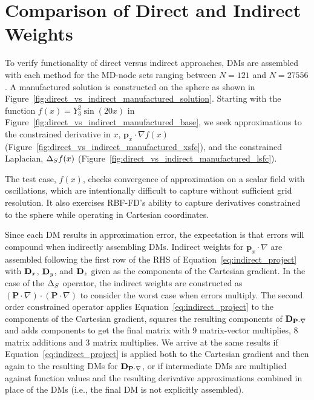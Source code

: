 \section{Comparison of Direct and Indirect Weights} 


To verify functionality of direct versus indirect approaches, DMs are assembled with each method for the MD-node sets ranging between $N = 121$ and $N=27556$. A manufactured solution is constructed on the sphere as shown in Figure~\ref{fig:direct_vs_indirect_manufactured_solution}. Starting with the function $f(x) = Y_3^2 \sin(20x)$ in Figure~\ref{fig:direct_vs_indirect_manufactured_base}, we seek approximations to the constrained derivative in $x$, $\mathbf{p}_{x} \cdot \nabla f(x)$ (Figure~\ref{fig:direct_vs_indirect_manufactured_xsfc}), and the constrained Laplacian, $\Delta_S f(x)$ (Figure~\ref{fig:direct_vs_indirect_manufactured_lsfc}). 

The test case, $f(x)$, checks convergence of approximation on a scalar field with oscillations, which are intentionally difficult to capture without sufficient grid resolution. It also exercises RBF-FD's ability to capture derivatives constrained to the sphere while operating in Cartesian coordinates. 

Since each DM results in approximation error, the expectation is that errors will compound when indirectly assembling DMs.  
Indirect weights for $\mathbf{p}_{x} \cdot \nabla$ are assembled following the first row of the RHS of Equation~\ref{eq:indirect_project} with $\mathbf{D}_x$, $\mathbf{D}_y$, and $\mathbf{D}_z$ given as the components of the Cartesian gradient. In the case of the $\Delta_S$ operator, the indirect weights are constructed as $(\mathbf{P} \cdot \nabla) \cdot (\mathbf{P} \cdot \nabla)$ to consider the worst case when errors multiply. The second order constrained operator applies Equation~\ref{eq:indirect_project} to the components of the Cartesian gradient, squares the resulting components of $\mathbf{D}_{\mathbf{P} \cdot \nabla}$ and adds components to get the final matrix with 9 matrix-vector multiplies, 8 matrix additions and 3 matrix multiplies. We arrive at the same results if Equation~\ref{eq:indirect_project} is applied both to the Cartesian gradient and then again to the resulting DMs for $\mathbf{D}_{\mathbf{P} \cdot \nabla}$, or if intermediate DMs are multiplied against function values and the resulting derivative approximations combined in place of the DMs (i.e., the final DM is not explicitly assembled). 

